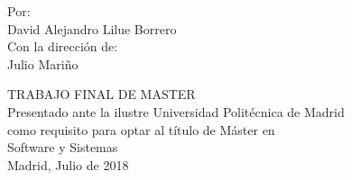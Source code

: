 \begin{titlepage}
\begin{center}
        Por:\\
        David Alejandro Lilue Borrero\\
        Con la dirección de:\\
        Julio Mariño\\

        \vfill

        TRABAJO FINAL DE MASTER\\
        Presentado ante la ilustre Universidad Politécnica de Madrid\\
        como requisito para optar al título de Máster en\\
        Software y Sistemas\\

        \vfill
        Madrid, Julio de 2018
    \end{center}
\end{titlepage}

\newpage